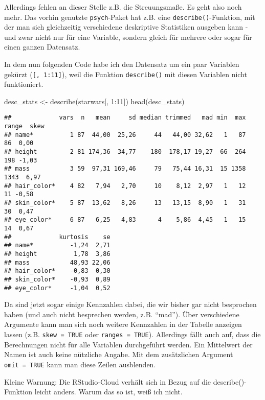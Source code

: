 \documentclass[
]{book}
\newenvironment{Shaded}{\begin{snugshade}}{\end{snugshade}}
\newcommand{\DecValTok}[1]{\textcolor[rgb]{0.00,0.00,0.81}{#1}}
\newcommand{\FunctionTok}[1]{\textcolor[rgb]{0.00,0.00,0.00}{#1}}
\newcommand{\NormalTok}[1]{#1}
\newcommand{\OtherTok}[1]{\textcolor[rgb]{0.56,0.35,0.01}{#1}}
\newcommand{\SpecialCharTok}[1]{\textcolor[rgb]{0.00,0.00,0.00}{#1}}
\begin{document}
Allerdings fehlen an dieser Stelle z.B. die Streuungsmaße. Es geht also noch mehr. Das vorhin genutzte \texttt{psych}-Paket hat z.B. eine \texttt{describe()}-Funktion, mit der man sich gleichzeitig verschiedene deskriptive Statistiken ausgeben kann - und zwar nicht nur für eine Variable, sondern gleich für mehrere oder sogar für einen ganzen Datensatz.

In dem nun folgenden Code habe ich den Datensatz um ein paar Variablen gekürzt (\texttt{{[},\ 1:11{]}}), weil die Funktion \texttt{describe()} mit diesen Variablen nicht funktioniert.

\begin{Shaded}
\begin{Highlighting}[]
\NormalTok{desc\_stats }\OtherTok{\textless{}{-}} \FunctionTok{describe}\NormalTok{(starwars[, }\DecValTok{1}\SpecialCharTok{:}\DecValTok{11}\NormalTok{])}
\FunctionTok{head}\NormalTok{(desc\_stats)}
\end{Highlighting}
\end{Shaded}

\begin{verbatim}
##             vars  n   mean     sd median trimmed   mad min  max range  skew
## name*          1 87  44,00  25,26     44   44,00 32,62   1   87    86  0,00
## height         2 81 174,36  34,77    180  178,17 19,27  66  264   198 -1,03
## mass           3 59  97,31 169,46     79   75,44 16,31  15 1358  1343  6,97
## hair_color*    4 82   7,94   2,70     10    8,12  2,97   1   12    11 -0,58
## skin_color*    5 87  13,62   8,26     13   13,15  8,90   1   31    30  0,47
## eye_color*     6 87   6,25   4,83      4    5,86  4,45   1   15    14  0,67
##             kurtosis    se
## name*          -1,24  2,71
## height          1,78  3,86
## mass           48,93 22,06
## hair_color*    -0,83  0,30
## skin_color*    -0,93  0,89
## eye_color*     -1,04  0,52
\end{verbatim}

Da sind jetzt sogar einige Kennzahlen dabei, die wir bisher gar nicht besprochen haben (und auch nicht besprechen werden, z.B. ``mad''). Über verschiedene Argumente kann man sich noch weitere Kennzahlen in der Tabelle anzeigen lassen (z.B. \texttt{skew\ =\ TRUE} oder \texttt{ranges\ =\ TRUE}). Allerdings fällt auch auf, dass die Berechnungen nicht für alle Variablen durchgeführt werden. Ein Mittelwert der Namen ist auch keine nützliche Angabe. Mit dem zusätzlichen Argument \texttt{omit\ =\ TRUE} kann man diese Zeilen ausblenden.

Kleine Warnung: Die RStudio-Cloud verhält sich in Bezug auf die describe()-Funktion leicht anders. Warum das so ist, weiß ich nicht.
\end{document}
